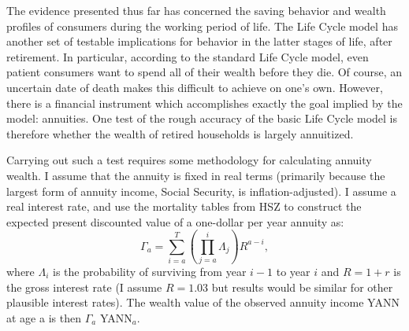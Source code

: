 \documentclass[titlepage,12pt]{article}
\begin{document}
\hypertarget{Top1pctWProfilePatientvsSCF}{}

The evidence presented thus far has concerned the saving behavior and 
wealth profiles of consumers during the working period of life.  The 
Life Cycle model has another set of testable implications for behavior 
in the latter stages of life, after retirement.  In particular, 
according to the standard Life Cycle model, even patient consumers 
want to spend all of their wealth before they die.  Of course, an 
uncertain date of death makes this difficult to achieve on one's own.  
However, there is a financial instrument which accomplishes exactly 
the goal implied by the model: annuities.  One test of the rough 
accuracy of the basic Life Cycle model is therefore whether the wealth 
of retired households is largely annuitized.

Carrying out such a test requires some methodology for calculating 
annuity wealth.  I assume that the annuity is fixed in real terms 
(primarily because the largest form of annuity income, Social 
Security, is inflation-adjusted).  I assume a real interest rate, and 
use the mortality tables from HSZ to construct the expected present 
discounted value of a one-dollar per year annuity as:
\begin{equation}
\Gamma_{a} = \sum_{i=a}^{T} \left(\prod_{j=a}^{i} \Lambda_{j}\right) R^{a-i},
\end{equation}
where $\Lambda_{i}$ is the probability of surviving from year $i-1$ to 
year $i$ and $R=1+r$ is the gross interest rate (I assume $R=1.03$ but 
results would be similar for other plausible interest rates).  The 
wealth value of the observed annuity income YANN at age a is then 
$\Gamma_{a}$ YANN$_{a}$.
\end{document}
